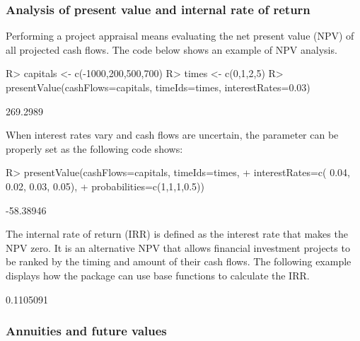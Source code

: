 \documentclass[nojss]{jss}
\begin{document}
\subsubsection{Analysis of present value and internal rate of return}\label{sss:pva}
Performing a project appraisal means evaluating the net present value (NPV) of all projected cash flows.
The code below shows an example of NPV analysis.
\begin{Schunk}
\begin{Sinput}
R> capitals <- c(-1000,200,500,700)
R> times <- c(0,1,2,5)
R> presentValue(cashFlows=capitals, timeIds=times, interestRates=0.03)
\end{Sinput}
\begin{Soutput}
[1] 269.2989
\end{Soutput}
\end{Schunk}
When interest rates vary and cash flows are uncertain, the
 parameter can be
properly set as the following code shows:
\begin{Schunk}
\begin{Sinput}
R> presentValue(cashFlows=capitals, timeIds=times, 
+  interestRates=c( 0.04, 0.02, 0.03, 0.05), 
+  probabilities=c(1,1,1,0.5))
\end{Sinput}
\begin{Soutput}
[1] -58.38946
\end{Soutput}
\end{Schunk}
The internal rate of return (IRR) is defined as the interest rate that makes the
NPV zero. It is an alternative NPV that allows financial investment projects to be ranked
by the timing and amount of their cash flows.
The following example displays how the
 package can use base  functions to calculate the IRR.

\begin{Schunk}
\begin{Soutput}
[1] 0.1105091
\end{Soutput}
\end{Schunk}


\subsubsection{Annuities and future values}\label{sss:annfv}
\end{document}

